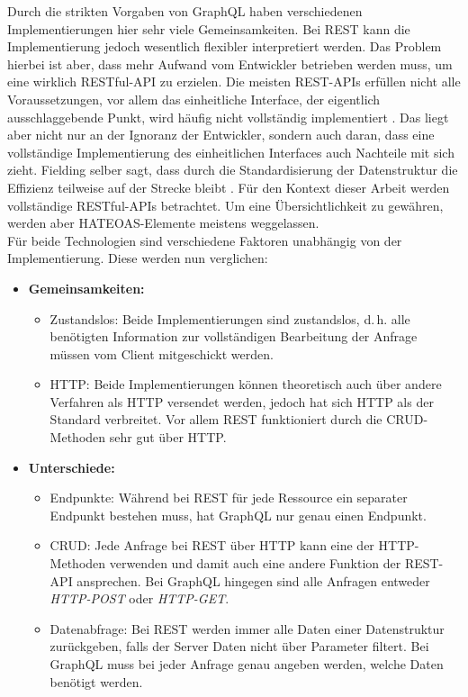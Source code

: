 Durch die strikten Vorgaben von GraphQL haben verschiedenen Implementierungen hier sehr viele Gemeinsamkeiten. Bei \ac{REST} kann die Implementierung jedoch wesentlich flexibler interpretiert werden. Das Problem hierbei ist aber, dass mehr Aufwand vom Entwickler betrieben werden muss, um eine wirklich RESTful-API zu erzielen. Die meisten REST-APIs erfüllen nicht alle Voraussetzungen, vor allem das einheitliche Interface, der eigentlich ausschlaggebende Punkt, wird häufig nicht vollständig implementiert \parencite{Dupree2018}. Das liegt aber nicht nur an der Ignoranz der Entwickler, sondern auch daran, dass eine vollständige Implementierung des einheitlichen Interfaces auch Nachteile mit sich zieht. Fielding selber sagt, dass durch die Standardisierung der Datenstruktur die Effizienz teilweise auf der Strecke bleibt \parencite{Fielding2000}. Für den Kontext dieser Arbeit werden vollständige RESTful-APIs betrachtet. Um eine Übersichtlichkeit zu gewähren, werden aber \ac{HATEOAS}-Elemente meistens weggelassen.\\
Für beide Technologien sind verschiedene Faktoren unabhängig von der Implementierung. Diese werden nun verglichen:

\begin{itemize}
 \item \textbf{Gemeinsamkeiten:} 
\begin{itemize}
 \item Zustandslos: Beide Implementierungen sind zustandslos, d.\,h. alle benötigten Information zur vollständigen Bearbeitung der Anfrage müssen vom Client mitgeschickt werden.
 \item HTTP: Beide Implementierungen können theoretisch auch über andere Verfahren als \ac{HTTP} versendet werden, jedoch hat sich \ac{HTTP} als der Standard verbreitet. Vor allem \ac{REST} funktioniert durch die CRUD-Methoden sehr gut über \ac{HTTP}.
\end{itemize}
 \item \textbf{Unterschiede:} 
\begin{itemize}
 \item Endpunkte: Während bei \ac{REST} für jede Ressource ein separater Endpunkt bestehen muss, hat GraphQL nur genau einen Endpunkt.
\item CRUD: Jede Anfrage bei \ac{REST} über \ac{HTTP} kann eine der \ac{HTTP}-Methoden verwenden und damit auch eine andere Funktion der REST-API ansprechen. Bei GraphQL hingegen sind alle Anfragen entweder \textit{HTTP-POST} oder \textit{HTTP-GET}.
\item Datenabfrage: Bei \ac{REST} werden immer alle Daten einer Datenstruktur zurückgeben, falls der Server Daten nicht über Parameter filtert. Bei GraphQL muss bei jeder Anfrage genau angeben werden, welche Daten benötigt werden.
\end{itemize}
\end{itemize}